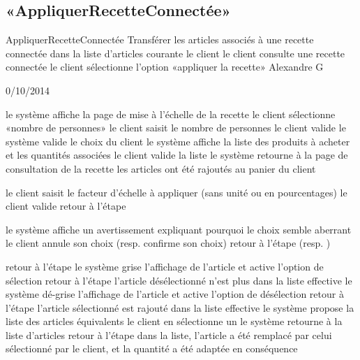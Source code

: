 \subsection[SS:CUD:AR]{«AppliquerRecetteConnectée»}

\startCU
\nom AppliquerRecetteConnectée
\but Transférer les articles associés à une recette connectée dans la liste d'articles courante
\acteur le client
\precondition le client consulte une recette connectée 
\declenchement le client sélectionne l'option «appliquer la recette»
\auteur Alexandre G
\date 30/10/2014

\nominal %
\startnominal
{} le système affiche la page de mise à l'échelle de la recette
 le client sélectionne «nombre de personnes» 
\etape le client saisit le nombre de personnes
\etape le client valide
 le système valide le choix du client
 le système affiche la liste des produits à acheter et les quantités associées
 le client valide la liste
\etape le système retourne à la page de consultation de la recette
\stopnominal
\postcondition les articles ont été rajoutés au panier du client

\alternatifs 
{} 
  \etape le client saisit le facteur d'échelle à appliquer (sans unité ou en pourcentages)
  \etape le client valide
  \etape retour à l'étape 
\stopcondition
\stopalternatif

  \etape le système affiche un avertissement expliquant pourquoi le choix semble aberrant
  \etape le client annule son choix (resp. confirme son choix)
  \etape retour à l'étape  (resp. )
\stopcondition
\stopalternatif

  \etape retour à l'étape 
\stopcondition
{} 
  \etape le système grise l'affichage de l'article et active l'option de sélection
  \etape retour à l'étape 
\stopcondition
\postcondition l'article désélectionné n'est plus dans la liste effective
  \etape le système dé-grise l'affichage de l'article et active l'option de désélection
  \etape retour à l'étape 
\stopcondition
\postcondition l'article sélectionné est rajouté dans la liste effective
  \etape le système propose la liste des articles équivalents
  \etape le client en sélectionne un
  \etape le système retourne à la liste d'articles
  \etape retour à l'étape 
\stopcondition
\postcondition dans la liste, l'article a été remplacé par celui sélectionné par le client, et la quantité a été adaptée en conséquence
\stopalternatif

